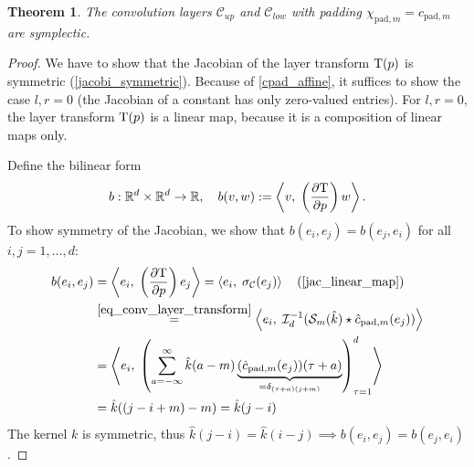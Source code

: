 \documentclass[twoside,a4paper]{article}
\newtheorem{theorem}{Theorem}
\begin{document}
\begin{theorem}\label{thm_conv_const_pad_symplectic}
	The convolution layers $\mathcal{C}_{up}$ and $\mathcal{C}_{low}$
	with padding $\chi_{\text{pad},m} = c_{\text{pad},m}$ are symplectic.
\end{theorem}
\begin{proof}
	We have to show that the Jacobian of the layer transform $\mathrm{T}(p)$
	is symmetric (\cref{jacobi_symmetric}).
	Because of \cref{cpad_affine}, it suffices to show the case $l,r=0$ (the Jacobian
	of a constant has only zero-valued entries). For $l,r=0$, the layer transform 
	$\mathrm{T}(p)$ 
	is a linear map, because it is a composition of linear maps only.

	Define the bilinear form
	\begin{equation}\label{eq_bilinear_proof_conv}
		b : \mathbb{R}^d \times \mathbb{R}^d \to \mathbb{R},
		\quad b(v,w) := \left\langle v,\; \left( \frac{\partial \mathrm{T}}{\partial p} \right) w \right\rangle
		.
	\end{equation}
	To show symmetry of the Jacobian, we show that 
	$b(e_i, e_j) = b(e_j, e_i)$ for all $i,j=1,\dots,d$:
	\begin{align*}
		b(e_i, e_j) &= \ip{e_i}{\lb \jac{\layertf}{p} \rb e_j}
		= \ip{e_i}{\activation_{\mathcal{C}}(e_j)} \quad \text{(\cref{jac_linear_map})} \\
		&\stackrel{\cref{eq_conv_layer_transform}}{=} \ip{e_i}{\mathcal{I}_{d}^{-1} (
			\mathcal{S}_{m}(\hat{k}) \star \hat{c}_{\text{pad},m}(e_j)
		)} \\
		&= \ip{e_i}{
			\lb \sum_{a=-\infty}^{\infty} 
				\hat{k}(a-m)
				\underbrace{(\hat{c}_{\text{pad},m}(e_j))(\tau+a)}_{
					= \delta_{(\tau+a) (j+m)}
				}
			\rb_{\tau=1}^d
		} \\
		&= \hat{k}((j-i+m)-m) = \hat{k}(j-i)
	\end{align*}
	The kernel $k$ is symmetric, thus $\hat{k}(j-i) = \hat{k}(i-j) \implies b(e_i, e_j) = b(e_j,e_i)$.
\end{proof}
\end{document}
